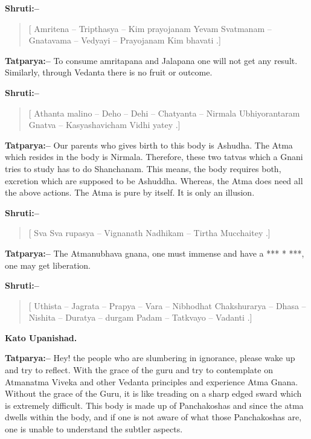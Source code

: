 \textbf{Shruti:–}

\begin{verse}
[ Amritena – Tripthasya – Kim prayojanam  Yevam Svatmanam – Gnatavama – Vedyayi – Prayojanam Kim bhavati .]
\end{verse}

\textbf{Tatparya:–} To consume amritapana and Jalapana one will not get any result. Similarly, through Vedanta there is no fruit or outcome.

\textbf{Shruti:–}

\begin{verse}
[ Athanta malino – Deho – Dehi – Chatyanta – Nirmala  Ubhiyorantaram Gnatva – Kasyashavicham Vidhi yatey .]
\end{verse}

\textbf{Tatparya:–} Our parents who gives birth to this body is Ashudha. The Atma which resides in the body is Nirmala. Therefore, these two tatvas which a Gnani tries to study has to do Shanchanam. This means, the body requires both, excretion which are supposed to be Ashuddha. Whereas, the Atma does need all the above actions. The Atma is pure by itself. It is only an illusion.

\textbf{Shruti:–}

\begin{verse}
[ Sva Sva rupasya – Vignanath Nadhikam – Tirtha Mucchaitey .]
\end{verse}

\textbf{Tatparya:–} The Atmanubhava gnana, one must immense and have a *** * ***, one may get liberation.

\textbf{Shruti:–}

\begin{verse}
[ Uthista – Jagrata – Prapya – Vara – Nibhodhat  Chakshurarya – Dhasa – Nishita – Duratya – durgam Padam – Tatkvayo – Vadanti .]
\end{verse}

\begin{flushright}
\textbf{Kato Upanishad.}
\end{flushright}

\textbf{Tatparya:–} Hey! the people who are slumbering in ignorance, please wake up and try to reflect. With the grace of the guru and try to contemplate on Atmanatma Viveka and other Vedanta principles and experience Atma Gnana. Without the grace of the Guru, it is like treading on a sharp edged sward which is extremely difficult. This body is made up of Panchakoshas and since the atma dwells within the body, and if one is not aware of what those Panchakoshas are, one is unable to understand the subtler aspects.

